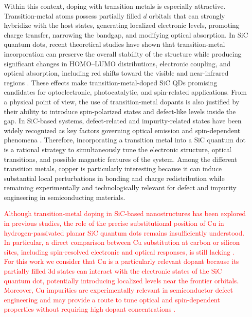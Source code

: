\documentclass[11pt]{article} %
\begin{document}
Within this context, doping with transition metals is especially attractive. Transition-metal atoms possess partially filled $d$ orbitals that can strongly hybridize with the host states, generating localized electronic levels, promoting charge transfer, narrowing the bandgap, and modifying optical absorption. In SiC quantum dots, recent theoretical studies have shown that transition-metal incorporation can preserve the overall stability of the structure while producing significant changes in HOMO--LUMO distributions, electronic coupling, and optical absorption, including red shifts toward the visible and near-infrared regions \cite{Castelletto2020}. These effects make transition-metal-doped SiC QDs promising candidates for optoelectronic, photocatalytic, and spin-related applications.
From a physical point of view, the use of transition-metal dopants is also justified by their ability to introduce spin-polarized states and defect-like levels inside the gap. In SiC-based systems, defect-related and impurity-related states have been widely recognized as key factors governing optical emission and spin-dependent phenomena \cite{Castelletto2020,Masashi_2011}. Therefore, incorporating a transition metal into a SiC quantum dot is a rational strategy to simultaneously tune the electronic structure, optical transitions, and possible magnetic features of the system. Among the different transition metals, copper is particularly interesting because it can induce substantial local perturbations in bonding and charge redistribution while remaining experimentally and technologically relevant for defect and impurity engineering in semiconducting materials.

\textcolor{red}{Although transition-metal doping in SiC-based nanostructures has been explored in previous studies, the role of the precise substitutional position of Cu in hydrogen-passivated planar SiC quantum dots remains insufficiently understood. In particular, a direct comparison between Cu substitution at carbon or silicon sites, including spin-resolved electronic and optical responses, is still lacking \cite{FluorescentSiCNPs, EngineeringSiCQDs}.
\\
For this work we consider that Cu is a particularly relevant dopant because its partially filled 3d states can interact with the electronic states of the SiC quantum dot, potentially introducing localized levels near the frontier orbitals. Moreover, Cu impurities are experimentally relevant in semiconductor defect engineering and may provide a route to tune optical and spin-dependent properties without requiring high dopant concentrations \cite{Castelletto2020}.
}
\\
\end{document}
